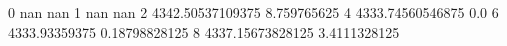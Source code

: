 0 nan nan
1 nan nan
2 4342.50537109375 8.759765625
4 4333.74560546875 0.0
6 4333.93359375 0.18798828125
8 4337.15673828125 3.4111328125
